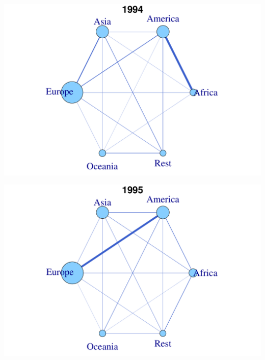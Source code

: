 \documentclass[a4paper,ngerman,oneside,titlepage,bibliography=totoc,11pt]{scrreprt}
\begin{document}
\begin{minipage}[t]{0.48\textwidth}
		\centering
			\includegraphics[width=1\textwidth]{Grafiken/Cont_Ani/cont3.pdf}
\end{minipage}	
\hfill	
\begin{minipage}[t]{0.48\textwidth}	
			\centering
			\includegraphics[width=1\textwidth]{Grafiken/Cont_Ani/cont4.pdf}
\end{minipage}
\end{document}
